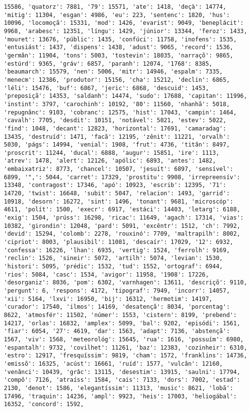 \begin{Verbatim}[commandchars=\\\{\}]
15586, 'quatorz': 7881, '79': 15571, 'ate': 1418, 'deçà': 14774, 'mitig': 11304, 'esgan': 4986, 'eu': 223, 'sentenc': 1820, 'hus': 10096, 'locomoçã': 15331, 'mod': 1426, 'evarist': 9049, 'beneplácit': 9968, 'arabesc': 12351, 'língu': 1429, 'júnior': 13344, 'feroz': 1433, 'mouret': 13676, 'públic': 1435, 'confúci': 11758, 'inofens': 1535, 'entusiást': 1437, 'dispens': 1438, 'adust': 9065, 'record': 1536, 'germân': 11904, 'tons': 5003, 'tostevin': 18035, 'narraçõ': 9865, 'estúrd': 9365, 'gráv': 6857, 'paranh': 12074, '1768': 8385, 'beaumarch': 15579, 'nen': 5006, 'mitr': 14946, 'espalm': 7335, 'menecm': 12386, 'produtor': 15156, 'cha': 15212, 'declin': 6865, 'léli': 15476, 'buf': 6867, 'jeric': 6868, 'descuid': 1453, 'preposiçã': 14353, 'saldanh': 14474, 'sudo': 17688, 'capitan': 11996, 'instint': 3797, 'carochinh': 10192, '80': 11560, 'nhanhã': 5018, 'repugnânc': 9103, 'cobranc': 12575, 'hist': 17043, 'campin': 1464, 'cavalh': 7705, 'desdit': 10151, 'notável': 5021, 'estev': 5022, 'find': 1048, 'decant': 12823, 'horizontal': 17691, 'camaradag': 13435, 'destruíd': 1471, 'facã': 12195, 'zênit': 11221, 'orvalh': 5030, 'págs': 14994, 'venial': 1908, 'frut': 4736, 'titân': 8497, 'proscrit': 11244, 'ducal': 6888, 'augur': 15851, 'ire': 1113, 'atrev': 1478, 'alert': 12126, 'apólic': 6893, 'antes': 1482, 'embaixatriz': 8773, 'chancel': 10507, 'jesuít': 6897, 'sensível': 6899, '",': 5044, 'carret': 17329, 'prostitu': 9908, 'irrepreensív': 13348, 'contragost': 17346, 'apó': 10923, 'escrib': 12395, '71': 14720, 'twist': 16648, 'subit': 5047, 'relacion': 1493, 'garrid': 10918, 'desorn': 16272, 'sint': 1496, 'tonant': 9681, 'microscóp': 4611, 'polít': 1500, 'execr': 6917, 'estáci': 14403, 'letarg': 6188, 'exig': 1504, 'prúss': 16298, 'ricac': 11649, 'agach': 17314, 'vias': 10382, 'girondin': 12048, 'pard': 5091, 'excêntr': 1512, 'ch': 7992, 'devid': 15294, 'colomb': 2278, 'rouxinó': 7709, 'maltrapilh': 8002, 'cipriot': 8003, 'plausibil': 11081, 'descaír': 17029, '12': 6932, 'confessa': 16226, 'lhan': 6935, 'vertig': 1524, 'ferrolh': 9169, 'reclin': 1526, 'sineir': 5072, 'artilh': 5074, 'levian': 1530, 'histori': 5095, 'prédic': 1532, 'tud': 1552, 'ortograf': 6944, 'rios': 5084, 'casc': 1534, 'avigor': 11958, '1908': 17226, 'desorganiz': 8036, 'pom': 6302, 'varnhagen': 13611, 'descriçõ': 9110, 'pergunt': 6, 'respons': 4172, 'tipograf': 7949, 'incorr': 14057, 'xii': 5164, 'lxvi': 16950, 'bij': 16312, 'hermotim': 14197, 'curador': 17540, 'ilmos': 14169, 'desatençã': 8034, 'porcentag': 8622, 'atmosfér': 11502, 'númer': 1553, 'cistern': 8199, 'prebend': 14217, 'orlas': 16832, 'amplex': 5099, 'bal': 9202, 'episódi': 1561, 'fiar': 6054, '27': 4619, 'dar': 1563, 'adapt': 7136, 'abstençã': 1567, 'viv': 1568, 'meteorológ': 15645, 'rua': 1616, 'possuím': 6980, 'espantalh': 9732, 'covilhet': 11261, 'baz': 12383, 'cozinheir': 6310, 'estro': 12917, 'fresquíssim': 9819, 'cham': 1572, 'franklins': 14736, 'emissõ': 16325, 'acúst': 16661, 'ruíd': 1577, 'vulcân': 12160, 'venânci': 10439, 'grâc': 13115, 'desestim': 13915, 'saulni': 17794, 'compô': 7126, 'atraíss': 1584, 'cais': 7133, 'dors': 7002, 'estad': 2130, 'denot': 1586, 'elegantíssim': 11313, 'music': 8621, 'lobã': 17496, 'traquin': 14236, 'ampl': 9923, 'heis': 17003, 'heliogábal': 16352, 'concord': 1592, 
\end{Verbatim}
